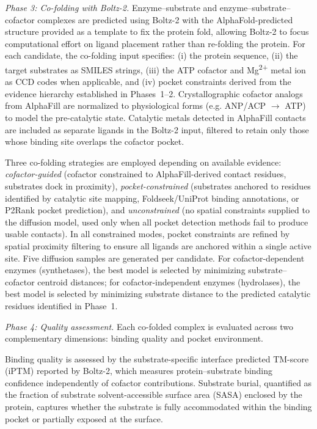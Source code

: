 \documentclass[12pt]{article}
\begin{document}
\textit{Phase 3: Co-folding with Boltz-2.} Enzyme--substrate and enzyme--substrate--cofactor complexes are predicted using Boltz-2 with the AlphaFold-predicted structure provided as a template to fix the protein fold, allowing Boltz-2 to focus computational effort on ligand placement rather than re-folding the protein. For each candidate, the co-folding input specifies: (i) the protein sequence, (ii) the target substrates as SMILES strings, (iii) the ATP cofactor and Mg\textsuperscript{2+} metal ion as CCD codes when applicable, and (iv) pocket constraints derived from the evidence hierarchy established in Phases~1--2. Crystallographic cofactor analogs from AlphaFill are normalized to physiological forms (e.g. ANP/ACP $\rightarrow$ ATP) to model the pre-catalytic state. Catalytic metals detected in AlphaFill contacts are included as separate ligands in the Boltz-2 input, filtered to retain only those whose binding site overlaps the cofactor pocket. 

Three co-folding strategies are employed depending on available evidence: \textit{cofactor-guided} (cofactor constrained to AlphaFill-derived contact residues, substrates dock in proximity), \textit{pocket-constrained} (substrates anchored to residues identified by catalytic site mapping, Foldseek/UniProt binding annotations, or P2Rank pocket prediction), and \textit{unconstrained} (no spatial constraints supplied to the diffusion model, used only when all pocket detection methods fail to produce usable contacts). In all constrained modes, pocket constraints are refined by spatial proximity filtering to ensure all ligands are anchored within a single active site. Five diffusion samples are generated per candidate. For cofactor-dependent enzymes (synthetases), the best model is selected by minimizing substrate--cofactor centroid distances; for cofactor-independent enzymes (hydrolases), the best model is selected by minimizing substrate distance to the predicted catalytic residues identified in Phase~1.

\textit{Phase 4: Quality assessment.} Each co-folded complex is evaluated across two complementary dimensions: binding quality and pocket environment.

Binding quality is assessed by the substrate-specific interface predicted TM-score (iPTM) reported by Boltz-2, which measures protein--substrate binding confidence independently of cofactor contributions. Substrate burial, quantified as the fraction of substrate solvent-accessible surface area (SASA) enclosed by the protein, captures whether the substrate is fully accommodated within the binding pocket or partially exposed at the surface.
\end{document}
